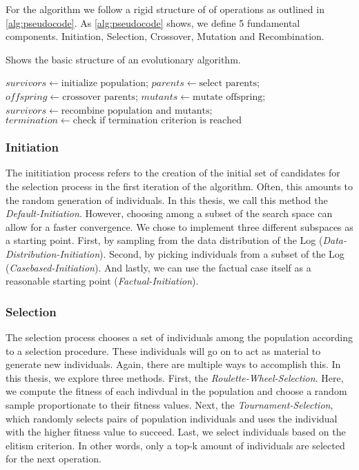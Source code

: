 \documentclass[./../../paper.tex]{subfiles}
\begin{document}
For the algorithm we follow a rigid structure of of operations as outlined in \autoref{alg:pseudocode}. As \autoref{alg:pseudocode} shows, we define 5 fundamental components. Initiation, Selection, Crossover, Mutation and Recombination.

\begin{algorithm}[htb!]
    \label{alg:evolutionary}
    \caption{Shows the basic structure of an evolutionary algorithm.}
    \begin{algorithmic}
        \State $survivors \gets \text{initialize population}$;
            \State $parents \gets \text{select parents}$;
            \State $offspring \gets \text{crossover parents}$;
            \State $mutants \gets \text{mutate offspring}$;
            \State $survivors \gets \text{recombine population and mutants}$;
            \State $termination \gets \text{check if termination criterion is reached}$
        \EndWhile
    \end{algorithmic}
\end{algorithm}

\subsubsection{Initiation}
The inititiation process refers to the creation of the initial set of candidates for the selection process in the first iteration of the algorithm. Often, this amounts to the random generation of individuals. In this thesis, we call this method the \emph{Default-Initiation}. However, choosing among a subset of the search space can allow for a faster convergence. We chose to implement three different subspaces as a starting point. First, by sampling from the data distribution of the Log (\emph{Data-Distribution-Initiation}). Second, by picking individuals from a subset of the Log (\emph{Casebased-Initiation}). And lastly, we can use the factual case itself as a reasonable starting point (\emph{Factual-Initiation}).   

\subsubsection{Selection}
The selection process chooses a set of individuals among the population according to a selection procedure. These individuals will go on to act as material to generate new individuals. Again, there are multiple ways to accomplish this. In this thesis, we explore three methods. First, the \emph{Roulette-Wheel-Selection}. Here, we compute the fitness of each indivdual in the population and choose a random sample proportionate to their fitness values. Next, the \emph{Tournament-Selection}, which randomly selects pairs of population individuals and uses the individual with the higher fitness value to succeed. Last, we select individuals based on the elitism criterion. In other words, only a top-k amount of individuals are selected for the next operation.
\end{document}
